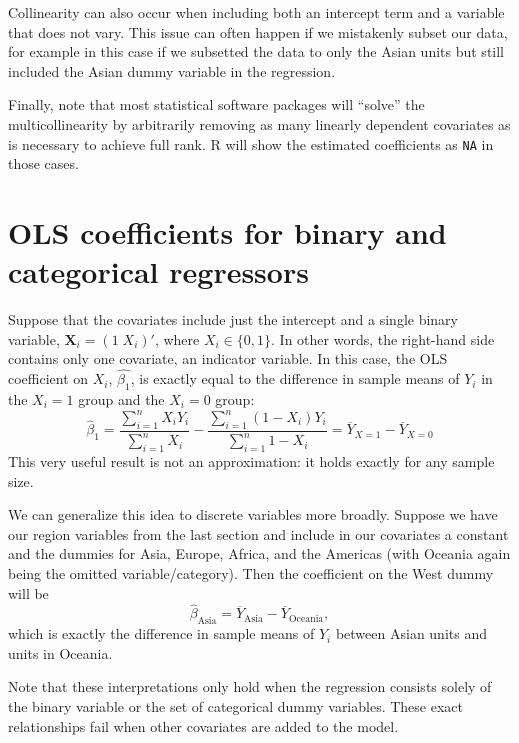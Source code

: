\documentclass[
  letterpaper,
  DIV=11,
  numbers=noendperiod]{scrreprt}
\newcommand{\mb}{\symbf}
\newcommand{\X}{\mb{X}}
\theoremstyle{plain}
\theoremstyle{definition}
\theoremstyle{definition}
\theoremstyle{remark}
\begin{document}
Collinearity can also occur when including both an intercept term and a
variable that does not vary. This issue can often happen if we
mistakenly subset our data, for example in this case if we subsetted the
data to only the Asian units but still included the Asian dummy variable
in the regression.

Finally, note that most statistical software packages will ``solve'' the
multicollinearity by arbitrarily removing as many linearly dependent
covariates as is necessary to achieve full rank. R will show the
estimated coefficients as \texttt{NA} in those cases.

\hypertarget{ols-coefficients-for-binary-and-categorical-regressors}{%
\section{OLS coefficients for binary and categorical
regressors}\label{ols-coefficients-for-binary-and-categorical-regressors}}

Suppose that the covariates include just the intercept and a single
binary variable, \(\X_i = (1\; X_{i})'\), where \(X_i \in \{0,1\}\). In
other words, the right-hand side contains only one covariate, an
indicator variable. In this case, the OLS coefficient on \(X_i\),
\(\widehat{\beta_{1}}\), is exactly equal to the difference in sample
means of \(Y_i\) in the \(X_i = 1\) group and the \(X_i = 0\) group: \[ 
\widehat{\beta}_{1} = \frac{\sum_{i=1}^{n} X_{i}Y_{i}}{\sum_{i=1}^{n} X_{i}} - \frac{\sum_{i=1}^{n} (1 - X_{i})Y_{i}}{\sum_{i=1}^{n} 1- X_{i}} = \overline{Y}_{X =1} - \overline{Y}_{X=0}
\] This very useful result is not an approximation: it holds exactly for
any sample size.

We can generalize this idea to discrete variables more broadly. Suppose
we have our region variables from the last section and include in our
covariates a constant and the dummies for Asia, Europe, Africa, and the
Americas (with Oceania again being the omitted variable/category). Then
the coefficient on the West dummy will be \[ 
\widehat{\beta}_{\text{Asia}} = \overline{Y}_{\text{Asia}} - \overline{Y}_{\text{Oceania}},
\] which is exactly the difference in sample means of \(Y_i\) between
Asian units and units in Oceania.

Note that these interpretations only hold when the regression consists
solely of the binary variable or the set of categorical dummy variables.
These exact relationships fail when other covariates are added to the
model.
\end{document}
